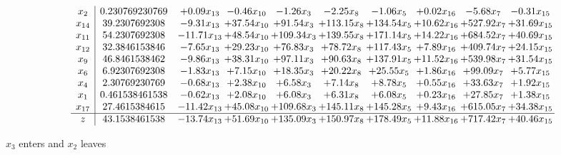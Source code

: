 \documentclass[9pt]{article}
\begin{document}
 \[\begin{array}{c| c c@{\hskip 2pt} c@{\hskip 2pt} c@{\hskip 2pt} c@{\hskip 2pt} c@{\hskip 2pt} c@{\hskip 2pt} c@{\hskip 2pt} c@{\hskip 2pt} }
 x_{2}   &  0.230769230769 & +  0.09 x_{13} & -0.46 x_{10} & -1.26 x_{3} & -2.25 x_{8} & -1.06 x_{5} & +  0.02 x_{16} & -5.68 x_{7} & -0.31 x_{15}\\
 x_{14}   &  39.2307692308 & -9.31 x_{13} & + 37.54 x_{10} & + 91.54 x_{3} & + 113.15 x_{8} & + 134.54 x_{5} & + 10.62 x_{16} & + 527.92 x_{7} & + 31.69 x_{15}\\
 x_{11}   &  54.2307692308 & -11.71 x_{13} & + 48.54 x_{10} & + 109.34 x_{3} & + 139.55 x_{8} & + 171.14 x_{5} & + 14.22 x_{16} & + 684.52 x_{7} & + 40.69 x_{15}\\
 x_{12}   &  32.3846153846 & -7.65 x_{13} & + 29.23 x_{10} & + 76.83 x_{3} & + 78.72 x_{8} & + 117.43 x_{5} & +  7.89 x_{16} & + 409.74 x_{7} & + 24.15 x_{15}\\
 x_{9}   &  46.8461538462 & -9.86 x_{13} & + 38.31 x_{10} & + 97.11 x_{3} & + 90.63 x_{8} & + 137.91 x_{5} & + 11.52 x_{16} & + 539.98 x_{7} & + 31.54 x_{15}\\
 x_{6}   &  6.92307692308 & -1.83 x_{13} & +  7.15 x_{10} & + 18.35 x_{3} & + 20.22 x_{8} & + 25.55 x_{5} & +  1.86 x_{16} & + 99.09 x_{7} & +  5.77 x_{15}\\
 x_{4}   &  2.30769230769 & -0.68 x_{13} & +  2.38 x_{10} & +  6.58 x_{3} & +  7.14 x_{8} & +  8.78 x_{5} & +  0.55 x_{16} & + 33.63 x_{7} & +  1.92 x_{15}\\
 x_{1}   &  0.461538461538 & -0.62 x_{13} & +  2.08 x_{10} & +  6.08 x_{3} & +  6.31 x_{8} & +  6.08 x_{5} & +  0.23 x_{16} & + 27.85 x_{7} & +  1.38 x_{15}\\
 x_{17}   &  27.4615384615 & -11.42 x_{13} & + 45.08 x_{10} & + 109.68 x_{3} & + 145.11 x_{8} & + 145.28 x_{5} & +  9.43 x_{16} & + 615.05 x_{7} & + 34.38 x_{15}\\
\hline
z    &  43.1538461538 & -13.74 x_{13} & + 51.69 x_{10} & + 135.09 x_{3} & + 150.97 x_{8} & + 178.49 x_{5} & + 11.88 x_{16} & + 717.42 x_{7} & + 40.46 x_{15}\\
\end{array}\]


 $ x_{3} $ enters and $ x_{2} $ leaves 
\end{document}
